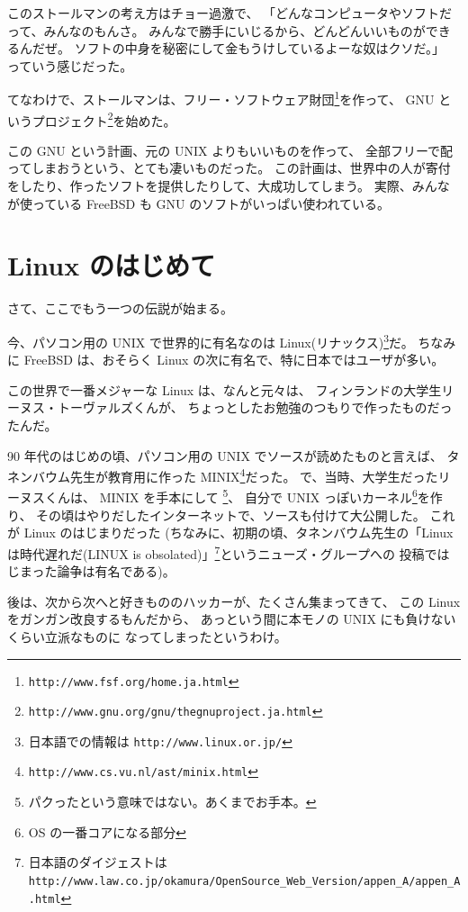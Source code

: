 \documentclass[11pt]{jarticle}
\begin{document}
\bigskip

このストールマンの考え方はチョー過激で、
「どんなコンピュータやソフトだって、みんなのもんさ。
みんなで勝手にいじるから、どんどんいいものができるんだぜ。
ソフトの中身を秘密にして金もうけしているよーな奴はクソだ。」
っていう感じだった。

\bigskip

てなわけで、ストールマンは、フリー・ソフトウェア財団\footnote{\texttt{http://www.fsf.org/home.ja.html}}を作って、
 GNU というプロジェクト\footnote{\texttt{http://www.gnu.org/gnu/thegnuproject.ja.html}}を始めた。

この GNU という計画、元の UNIX よりもいいものを作って、
全部フリーで配ってしまおうという、とても凄いものだった。
この計画は、世界中の人が寄付をしたり、作ったソフトを提供したりして、大成功してしまう。
実際、みんなが使っている FreeBSD も GNU のソフトがいっぱい使われている。

\section{Linux のはじめて}

さて、ここでもう一つの伝説が始まる。

\bigskip

今、パソコン用の UNIX で世界的に有名なのは Linux(リナックス)\footnote{日本語での情報は \texttt{http://www.linux.or.jp/}}だ。
ちなみに FreeBSD は、おそらく Linux の次に有名で、特に日本ではユーザが多い。

この世界で一番メジャーな Linux は、なんと元々は、
フィンランドの大学生リーヌス・トーヴァルズくんが、
ちょっとしたお勉強のつもりで作ったものだったんだ。

\bigskip

 90 年代のはじめの頃、パソコン用の UNIX でソースが読めたものと言えば、
タネンバウム先生が教育用に作った MINIX\footnote{\texttt{http://www.cs.vu.nl/{\TILDE}ast/minix.html}}だった。
で、当時、大学生だったリーヌスくんは、 MINIX を手本にして
\footnote{パクったという意味ではない。あくまでお手本。}、
自分で UNIX っぽいカーネル\footnote{OS の一番コアになる部分}を作り、
その頃はやりだしたインターネットで、ソースも付けて大公開した。
これが Linux のはじまりだった
(ちなみに、初期の頃、タネンバウム先生の「Linux は時代遅れだ(LINUX is obsolated)」\footnote{日本語のダイジェストは \texttt{http://www.law.co.jp/okamura/OpenSource\_Web\_Version/appen\_A/appen\_A.html}}というニューズ・グループへの
投稿ではじまった論争は有名である)。

後は、次から次へと好きもののハッカーが、たくさん集まってきて、
この Linux をガンガン改良するもんだから、
あっという間に本モノの UNIX にも負けないくらい立派なものに
なってしまったというわけ。
\end{document}
